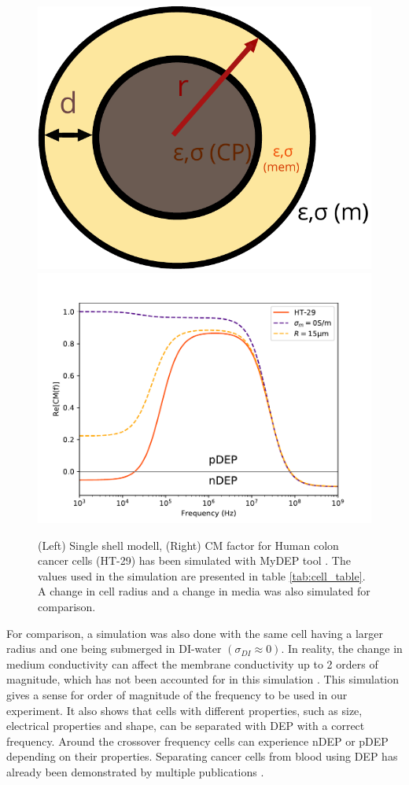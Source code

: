 \documentclass[draft]{jyflluk}
\begin{document}
\begin{figure}[h]%
    \centering
    \includegraphics[width=.27\linewidth]{images/single_shell.pdf}\quad\includegraphics[width=.61\linewidth]{images/plot_DEP.pdf}
    \qquad
    \begin{minipage}{1.2in}
    \end{minipage}%
    \caption{(Left) Single shell modell, (Right) CM factor for Human colon cancer cells (HT-29) has been simulated with MyDEP tool \cite{cottet_mydep_2019}. The values used in the simulation are presented in table \ref{tab:cell_table}. A change in cell radius and a change in media was also simulated for comparison.}%
    \label{fig:single_shell}%
\end{figure}


For comparison, a simulation was also done with the same cell having a larger radius and one being submerged in DI-water $(\sigma_{DI}\approx0)$. In reality, the change in medium conductivity can affect the membrane conductivity up to 2 orders of magnitude, which has not been accounted for in this simulation \cite{wu_dielectrophoretic_2012}. This simulation gives a sense for order of magnitude of the frequency to be used in our experiment. It also shows that cells with different properties, such as size, electrical properties and shape, can be separated with DEP with a correct frequency. Around the crossover frequency cells can experience nDEP or pDEP depending on their properties. Separating cancer cells from blood using DEP has already been demonstrated by multiple publications \cite{becker_separation_1995,huang_enrichment_2013,kang_continuous_2006, ivory_direct_2011}.
\end{document}
